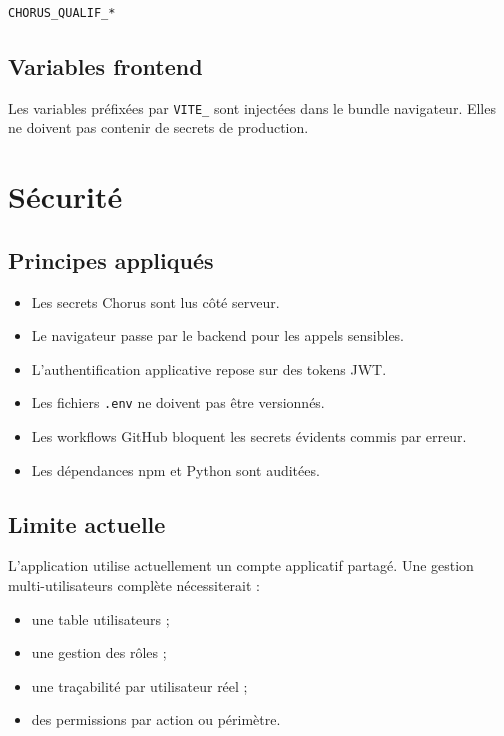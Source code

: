 \documentclass[11pt,a4paper]{article}
\begin{document}
\begin{lstlisting}
CHORUS_QUALIF_*
\end{lstlisting}

\subsection{Variables frontend}

Les variables préfixées par \texttt{VITE\_} sont injectées dans le bundle
navigateur. Elles ne doivent pas contenir de secrets de production.

\section{Sécurité}

\subsection{Principes appliqués}

\begin{itemize}
  \item Les secrets Chorus sont lus côté serveur.
  \item Le navigateur passe par le backend pour les appels sensibles.
  \item L'authentification applicative repose sur des tokens JWT.
  \item Les fichiers \texttt{.env} ne doivent pas être versionnés.
  \item Les workflows GitHub bloquent les secrets évidents commis par erreur.
  \item Les dépendances npm et Python sont auditées.
\end{itemize}

\subsection{Limite actuelle}

L'application utilise actuellement un compte applicatif partagé. Une gestion
multi-utilisateurs complète nécessiterait :

\begin{itemize}
  \item une table utilisateurs ;
  \item une gestion des rôles ;
  \item une traçabilité par utilisateur réel ;
  \item des permissions par action ou périmètre.
\end{itemize}
\end{document}
